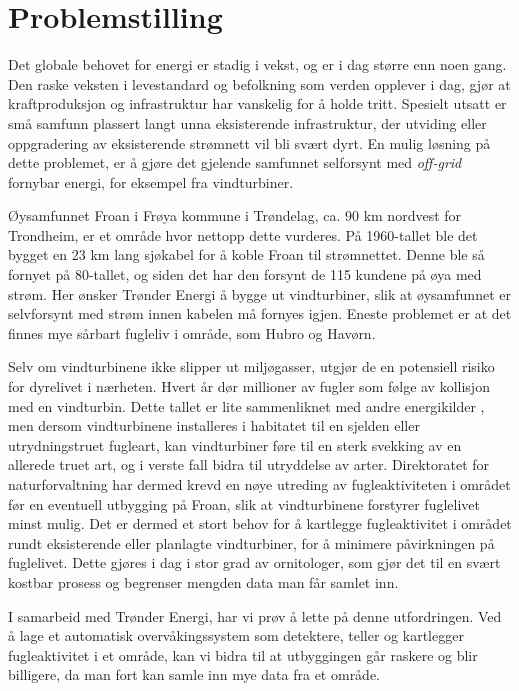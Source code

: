 \section{Problemstilling}
\label{sec:problemstilling}


Det globale behovet for energi er stadig i vekst, og er i dag større enn noen gang. Den raske veksten i levestandard og befolkning som verden opplever i dag, gjør at kraftproduksjon og infrastruktur har vanskelig for å holde tritt. Spesielt utsatt er små samfunn plassert langt unna eksisterende infrastruktur, der utviding eller oppgradering av eksisterende strømnett vil bli svært dyrt. En mulig løsning på dette problemet, er å gjøre det gjelende samfunnet selforsynt med \textit{off-grid} fornybar energi, for eksempel fra vindturbiner. 

Øysamfunnet Froan i Frøya kommune i Trøndelag, ca. 90 km nordvest for Trondheim, er et område hvor nettopp dette vurderes\cite{AvisFroanVind}. På 1960-tallet ble det bygget en 23 km lang sjøkabel for å koble Froan til strømnettet. Denne ble så fornyet på 80-tallet, og siden det har den forsynt de 115 kundene på øya med strøm. Her ønsker Trønder Energi å bygge ut vindturbiner, slik at øysamfunnet er selvforsynt med strøm innen kabelen må fornyes igjen. Eneste problemet er at det finnes mye sårbart fugleliv i område, som Hubro og Havørn. 

Selv om vindturbinene ikke slipper ut miljøgasser, utgjør de en potensiell risiko for dyrelivet i nærheten. Hvert år dør millioner av fugler som følge av kollisjon med en vindturbin\cite{dodfugler}. Dette tallet er lite sammenliknet med andre energikilder \cite{dodfugler}, men dersom vindturbinene installeres i habitatet til en sjelden eller utrydningstruet fugleart, kan vindturbiner føre til en sterk svekking av en allerede truet art, og i verste fall bidra til utryddelse av arter. Direktoratet for naturforvaltning har dermed krevd en nøye utreding av fugleaktiviteten i området før en eventuell utbygging på Froan, slik at vindturbinene forstyrer fuglelivet minst mulig\cite{froandn}. Det er dermed et stort behov for å kartlegge fugleaktivitet i området rundt eksisterende eller planlagte vindturbiner, for å minimere påvirkningen på fuglelivet. Dette gjøres i dag i stor grad av ornitologer, som gjør det til en svært kostbar prosess og begrenser mengden data man får samlet inn.

I samarbeid med Trønder Energi, har vi prøv å lette på denne utfordringen. Ved å lage et automatisk overvåkingssystem som detektere, teller og kartlegger fugleaktivitet i et område, kan vi bidra til at utbyggingen går raskere og blir billigere, da man fort kan samle inn mye data fra et område.